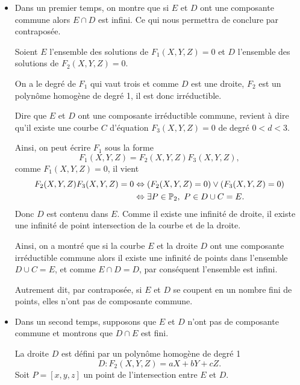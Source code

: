 \begin{demonstration}
    \begin{itemize}
        \item 
    Dans un premier temps, on montre que si $E$ et $D$ ont une composante commune alors $E
    \cap D$ est infini. Ce qui nous permettra de conclure par contraposée.

    Soient $E$ l'ensemble des solutions de $F_1(X,Y,Z) = 0$ et $D$ l'ensemble des solutions de
    $F_2(X,Y,Z) = 0$. 

    On a le degré de $F_1$ qui vaut trois et comme $D$ est une droite, $F_2$ est un polynôme
    homogène de degré 1, il est donc irréductible. 

    Dire que $E$ et $D$ ont une composante irréductible commune, revient à dire
    qu'il existe une courbe $C$ d'équation $F_3(X,Y,Z) = 0$ de degré $0<d<3$.

    Ainsi, on peut écrire $F_1$ sous la forme
    \[
    F_1(X,Y,Z) = F_2(X,Y,Z)F_3(X,Y,Z)
    ,\] 
    comme $F_1(X,Y,Z) = 0$, il vient 
    \begin{align*}
        F_2(X,Y,Z)F_3(X,Y,Z) = 0 & \Leftrightarrow \left( F_2(X,Y,Z)=0 \right)  \vee \left( F_3(X,Y,Z) = 0 \right)  \\
                                 & \Leftrightarrow \exists P \in \mathbb{P}_{2},\ P \in D \cup C = E 
    .\end{align*}
    Donc $D$ est contenu dans $E$. Comme il existe une infinité de droite, il existe une
    infinité de point intersection de la courbe et de la droite.

    Ainsi, on a montré que  si la courbe $E$ et la droite $D$ ont une composante irréductible
    commune alors il existe une infinité de points dans l'ensemble $D \cup C = E$, et
    comme $E \cap D = D$, par conséquent l'ensemble est infini.

    Autrement dit, par contraposée, si $E$ et $D$ se coupent en un nombre fini de points, elles n'ont pas
    de composante commune.

    \item Dans un second temps, supposons que $E$ et $D$ n'ont pas de composante commune et montrons
    que $D \cap E$ est fini.

    La droite $D$ est défini par un polynôme homogène de degré 1
    \[
    D : F_2(X,Y,Z) = aX + bY + cZ
    .\] 
    Soit $P=[x,y,z]$ un point de l'intersection entre $E$ et $D$.



\end{itemize}
\end{demonstration}
